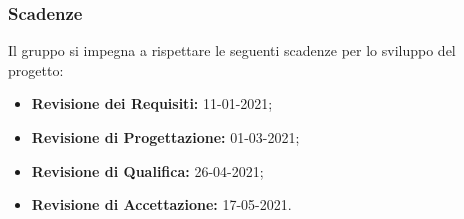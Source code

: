 \subsubsection{Scadenze}
Il gruppo \Gruppo{} si impegna a rispettare le seguenti scadenze per lo sviluppo del progetto:
\begin{itemize}
\item \textbf{Revisione dei Requisiti:} 11-01-2021;
\item \textbf{Revisione di Progettazione:} 01-03-2021;
\item \textbf{Revisione di Qualifica:} 26-04-2021;
\item \textbf{Revisione di Accettazione:} 17-05-2021.
\end{itemize}

